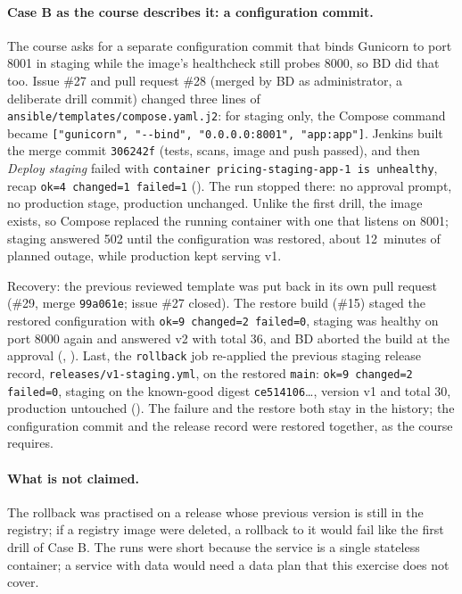 \paragraph{Case B as the course describes it: a configuration commit.} The course asks for a separate configuration commit that binds Gunicorn to port 8001 in staging while the image's healthcheck still probes 8000, so BD did that too. Issue \#27 and pull request \#28 (merged by BD as administrator, a deliberate drill commit) changed three lines of \texttt{ansible/templates/compose.yaml.j2}: for staging only, the Compose command became \texttt{["gunicorn", "-{}-bind", "0.0.0.0:8001", "app:app"]}. Jenkins built the merge commit \texttt{306242f} (tests, scans, image and push passed), and then \emph{Deploy staging} failed with \texttt{container pricing-staging-app-1 is unhealthy}, recap \texttt{ok=4 changed=1 failed=1} (). The run stopped there: no approval prompt, no production stage, production unchanged. Unlike the first drill, the image exists, so Compose replaced the running container with one that listens on 8001; staging answered 502 until the configuration was restored, about 12~minutes of planned outage, while production kept serving v1.

Recovery: the previous reviewed template was put back in its own pull request (\#29, merge \texttt{99a061e}; issue \#27 closed). The restore build (\#15) staged the restored configuration with \texttt{ok=9 changed=2 failed=0}, staging was healthy on port 8000 again and answered v2 with total 36, and BD aborted the build at the approval (, ). Last, the \texttt{rollback} job re-applied the previous staging release record, \texttt{releases/v1-staging.yml}, on the restored \texttt{main}: \texttt{ok=9 changed=2 failed=0}, staging on the known-good digest \texttt{ce514106}\ldots, version v1 and total 30, production untouched (). The failure and the restore both stay in the history; the configuration commit and the release record were restored together, as the course requires.

\paragraph{What is not claimed.} The rollback was practised on a release whose previous version is still in the registry; if a registry image were deleted, a rollback to it would fail like the first drill of Case B. The runs were short because the service is a single stateless container; a service with data would need a data plan that this exercise does not cover.

